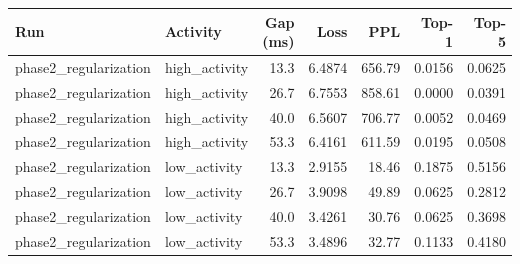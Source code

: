 \begin{tabular}{llrrrrr}
\toprule
Run & Activity & Gap (ms) & Loss & PPL & Top-1 & Top-5 \\
\midrule
phase2\_regularization & high\_activity & 13.3 & 6.4874 & 656.79 & 0.0156 & 0.0625 \\
phase2\_regularization & high\_activity & 26.7 & 6.7553 & 858.61 & 0.0000 & 0.0391 \\
phase2\_regularization & high\_activity & 40.0 & 6.5607 & 706.77 & 0.0052 & 0.0469 \\
phase2\_regularization & high\_activity & 53.3 & 6.4161 & 611.59 & 0.0195 & 0.0508 \\
phase2\_regularization & low\_activity & 13.3 & 2.9155 & 18.46 & 0.1875 & 0.5156 \\
phase2\_regularization & low\_activity & 26.7 & 3.9098 & 49.89 & 0.0625 & 0.2812 \\
phase2\_regularization & low\_activity & 40.0 & 3.4261 & 30.76 & 0.0625 & 0.3698 \\
phase2\_regularization & low\_activity & 53.3 & 3.4896 & 32.77 & 0.1133 & 0.4180 \\
\bottomrule
\end{tabular}
